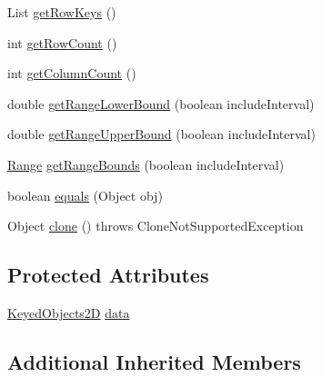 \begin{DoxyCompactItemize}
\item 
List \mbox{\hyperlink{classorg_1_1jfree_1_1data_1_1statistics_1_1_default_multi_value_category_dataset_ae75c8347b1a96730dab876b0d0daede9}{get\+Row\+Keys}} ()
\item 
int \mbox{\hyperlink{classorg_1_1jfree_1_1data_1_1statistics_1_1_default_multi_value_category_dataset_a50738261879dea73f8198740a043f342}{get\+Row\+Count}} ()
\item 
int \mbox{\hyperlink{classorg_1_1jfree_1_1data_1_1statistics_1_1_default_multi_value_category_dataset_a0b16d76dcd1480ca382fae84309d8e47}{get\+Column\+Count}} ()
\item 
double \mbox{\hyperlink{classorg_1_1jfree_1_1data_1_1statistics_1_1_default_multi_value_category_dataset_aa6e9185318787a0f602019c40b5ea9e7}{get\+Range\+Lower\+Bound}} (boolean include\+Interval)
\item 
double \mbox{\hyperlink{classorg_1_1jfree_1_1data_1_1statistics_1_1_default_multi_value_category_dataset_a508f2311f69392da32bad6065be873c4}{get\+Range\+Upper\+Bound}} (boolean include\+Interval)
\item 
\mbox{\hyperlink{classorg_1_1jfree_1_1data_1_1_range}{Range}} \mbox{\hyperlink{classorg_1_1jfree_1_1data_1_1statistics_1_1_default_multi_value_category_dataset_a30d182a50c2a77a29a772029d2ca3354}{get\+Range\+Bounds}} (boolean include\+Interval)
\item 
boolean \mbox{\hyperlink{classorg_1_1jfree_1_1data_1_1statistics_1_1_default_multi_value_category_dataset_a253f9195da0ae8074f1e8f5bc842a721}{equals}} (Object obj)
\item 
Object \mbox{\hyperlink{classorg_1_1jfree_1_1data_1_1statistics_1_1_default_multi_value_category_dataset_a61d983210d70fdbd26c35db6f5bea8f8}{clone}} ()  throws Clone\+Not\+Supported\+Exception 
\end{DoxyCompactItemize}
\subsection*{Protected Attributes}
\begin{DoxyCompactItemize}
\item 
\mbox{\hyperlink{classorg_1_1jfree_1_1data_1_1_keyed_objects2_d}{Keyed\+Objects2D}} \mbox{\hyperlink{classorg_1_1jfree_1_1data_1_1statistics_1_1_default_multi_value_category_dataset_a4c2294fd2d856df1020bd123e3cddab4}{data}}
\end{DoxyCompactItemize}
\subsection*{Additional Inherited Members}


